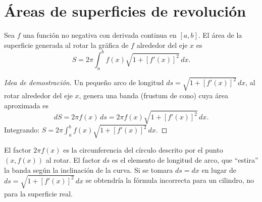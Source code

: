 \section{Áreas de superficies de revolución}

\begin{definition}
Sea $f$ una función no negativa con derivada continua en $[a,b]$. El área
de la superficie generada al rotar la gráfica de $f$ alrededor del eje $x$
es
\[
  S = 2\pi\int_a^b f(x)\sqrt{1+[f'(x)]^2}\,dx.
\]
\end{definition}

\begin{proof}[Idea de demostración]
Un pequeño arco de longitud $ds=\sqrt{1+[f'(x)]^2}\,dx$, al rotar alrededor
del eje $x$, genera una banda (frustum de cono) cuya área aproximada es
\[
  dS = 2\pi f(x)\,ds = 2\pi f(x)\sqrt{1+[f'(x)]^2}\,dx.
\]
Integrando: $S = 2\pi\int_a^b f(x)\sqrt{1+[f'(x)]^2}\,dx$. \qedhere
\end{proof}

\begin{rem}
El factor $2\pi f(x)$ es la circunferencia del círculo descrito por el
punto $(x,f(x))$ al rotar. El factor $ds$ es el elemento de longitud de
arco, que ``estira'' la banda según la inclinación de la curva. Si se
tomara $ds=dx$ en lugar de $ds=\sqrt{1+[f'(x)]^2}\,dx$ se obtendría la
fórmula incorrecta para un cilindro, no para la superficie real.
\end{rem}

